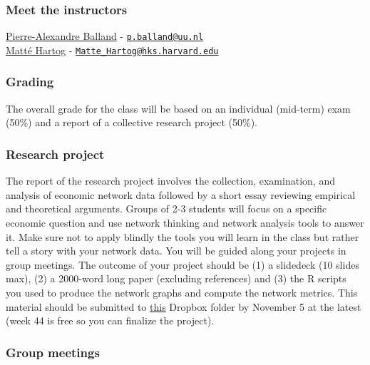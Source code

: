 \documentclass[
]{article}
\begin{document}
\hypertarget{meet-the-instructors}{%
\subsubsection{Meet the instructors}\label{meet-the-instructors}}

\href{https://www.paballand.com/}{Pierre-Alexandre Balland} -
\href{mailto:p.balland@uu.nl}{\nolinkurl{p.balland@uu.nl}}\\
\href{https://growthlab.cid.harvard.edu/people/matt\%C3\%A9-hartog}{Matté
Hartog} -
\href{mailto:Matte_Hartog@hks.harvard.edu}{\nolinkurl{Matte\_Hartog@hks.harvard.edu}}

\hypertarget{grading}{%
\subsubsection{Grading}\label{grading}}

The overall grade for the class will be based on an individual
(mid-term) exam (50\%) and a report of a collective research project
(50\%).

\hypertarget{research-project}{%
\subsubsection{Research project}\label{research-project}}

The report of the research project involves the collection, examination,
and analysis of economic network data followed by a short essay
reviewing empirical and theoretical arguments. Groups of 2-3 students
will focus on a specific economic question and use network thinking and
network analysis tools to answer it. Make sure not to apply blindly the
tools you will learn in the class but rather tell a story with your
network data. You will be guided along your projects in group meetings.
The outcome of your project should be (1) a slidedeck (10 slides max),
(2) a 2000-word long paper (excluding references) and (3) the R scripts
you used to produce the network graphs and compute the network metrics.
This material should be submitted to
\href{https://www.dropbox.com/request/5S0qHlfSJqTwvobh9Oca}{this}
Dropbox folder by November 5 at the latest (week 44 is free so you can
finalize the project).

\hypertarget{group-meetings}{%
\subsubsection{Group meetings}\label{group-meetings}}
\end{document}
